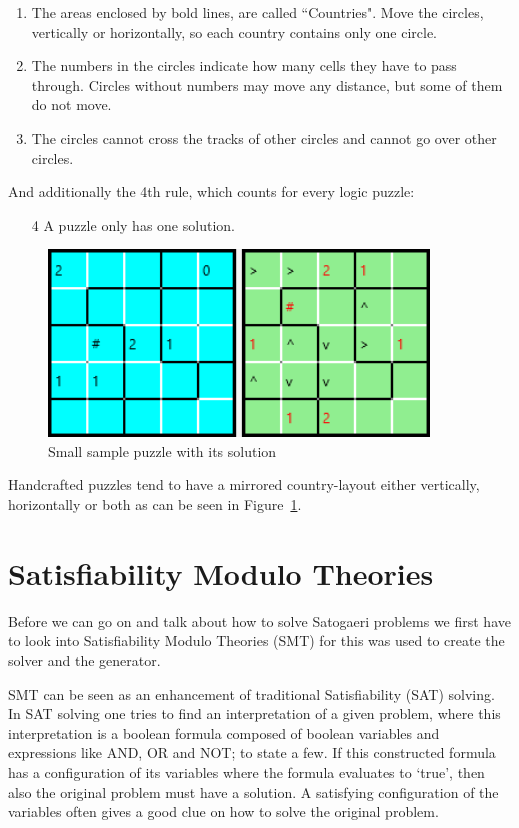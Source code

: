 \begin{enumerate}
  \item The areas enclosed by bold lines, are called ``Countries". Move the circles, vertically or horizontally, so each country contains only one circle.
  \item The numbers in the circles indicate how many cells they have to pass through. Circles without numbers may move any distance, but some of them do not move.
  \item The circles cannot cross the tracks of other circles and cannot go over other circles. 
\end{enumerate}
And additionally the 4th rule, which counts for every logic puzzle:
\begin{enumerate}
  \item[4] A puzzle only has one solution.
\end{enumerate}

\begin{figure}
  \centering
  \includegraphics[width=0.9\textwidth]{Pictures/sample_small.png} 
  \caption{Small sample puzzle with its solution}
  \label{fig:sample_small}
\end{figure}

Handcrafted puzzles tend to have a mirrored country-layout either vertically, horizontally or both as can be seen in Figure~\ref{fig:sample_small}.

\chapter{Satisfiability Modulo Theories} \label{Satisfiability Modulo Theories}
Before we can go on and talk about how to solve Satogaeri problems we first have to look into Satisfiability Modulo Theories (SMT) for this was used to create the solver and the generator.

SMT can be seen as an enhancement of traditional Satisfiability (SAT) solving. In SAT solving one tries to find an interpretation of a given problem, where this interpretation is a boolean formula composed of boolean variables and expressions like AND, OR and NOT; to state a few. If this constructed formula has a configuration of its variables where the formula evaluates to `true', then also the original problem must have a solution. A satisfying configuration of the variables often gives a good clue on how to solve the original problem.

